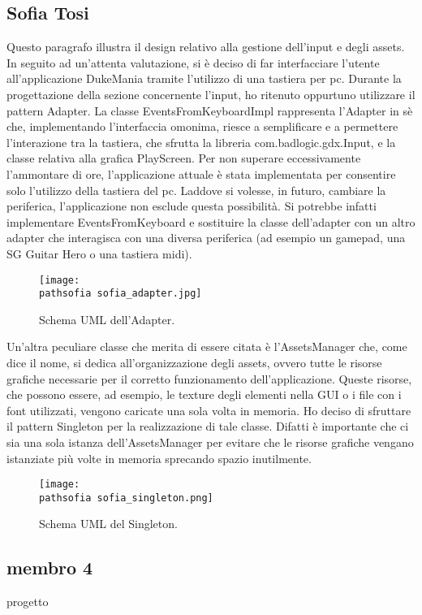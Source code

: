 \documentclass[a4paper,12pt]{report}
\newcommand\pathsofia{img/sofia/}
\begin{document}
\subsection{Sofia Tosi}
Questo paragrafo illustra il design relativo alla gestione dell'input e degli assets.
In seguito ad un'attenta valutazione, si è deciso di far interfacciare l'utente all'applicazione DukeMania tramite l'utilizzo di
una tastiera per pc. 
Durante la progettazione della sezione concernente l'input, ho ritenuto oppurtuno utilizzare il pattern Adapter.
La classe EventsFromKeyboardImpl rappresenta l'Adapter in sè che, implementando l'interfaccia omonima, riesce a semplificare e a permettere l'interazione
tra la tastiera, che sfrutta la libreria com.badlogic.gdx.Input, e la classe relativa alla grafica PlayScreen.
Per non superare eccessivamente l'ammontare di ore, l'applicazione attuale è stata implementata per consentire solo l'utilizzo della tastiera del pc. 
Laddove si volesse, in futuro, cambiare la periferica, l'applicazione non esclude questa possibilità. Si potrebbe infatti implementare EventsFromKeyboard 
e sostituire la classe dell'adapter con un altro adapter che interagisca con una diversa periferica (ad esempio un gamepad, una SG Guitar Hero o una tastiera midi).
\newline
\begin{figure}[!htb]
	\centerline{\texttt{[image: \\pathsofia sofia\_adapter.jpg]}}
	\caption{Schema UML dell'Adapter.}
	\label{img:adapter}
\end{figure}
\clearpage \hfill\break
Un'altra peculiare classe che merita di essere citata è l'AssetsManager che, come dice il nome, si dedica all'organizzazione degli assets, ovvero tutte le risorse grafiche
necessarie per il corretto funzionamento dell'applicazione. Queste risorse, che possono essere, ad esempio, le texture degli elementi nella GUI o i file con i font utilizzati,
vengono caricate una sola volta in memoria.
Ho deciso di sfruttare il pattern Singleton per la realizzazione di tale classe. Difatti è importante che ci sia una sola istanza dell'AssetsManager per evitare che le risorse 
grafiche vengano istanziate più volte in memoria sprecando spazio inutilmente. 
\newline
\begin{figure}[!htb]
	\centerline{\texttt{[image: \\pathsofia sofia\_singleton.png]}}
	\caption{Schema UML del Singleton.}
	\label{img:singleton}
\end{figure}
\newpage
\subsection{membro 4}
progetto 
\end{document}
